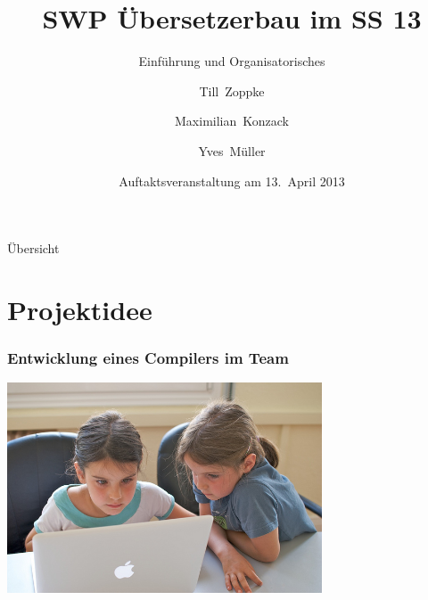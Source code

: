 \documentclass[ucs,9pt]{beamer}
\title{SWP Übersetzerbau im SS 13}
\subtitle{Einführung und Organisatorisches}
\author{Till~Zoppke \and Maximilian~Konzack \and Yves~Müller}
\institute[FU Berlin]{Freie Universität Berlin}
\date{Auftaktsveranstaltung am 13.~April 2013}
\begin{document}
\begin{frame}[plain]
  \titlepage
\end{frame}

\begin{frame}{Übersicht}
  \tableofcontents
\end{frame}

\section{Projektidee}
\begin{frame}
  \frametitle{Entwicklung eines Compilers im Team}
  \begin{center}
    \includegraphics[width=0.7\textwidth]{pair_prog}
  \end{center}
\end{frame}
\end{document}
